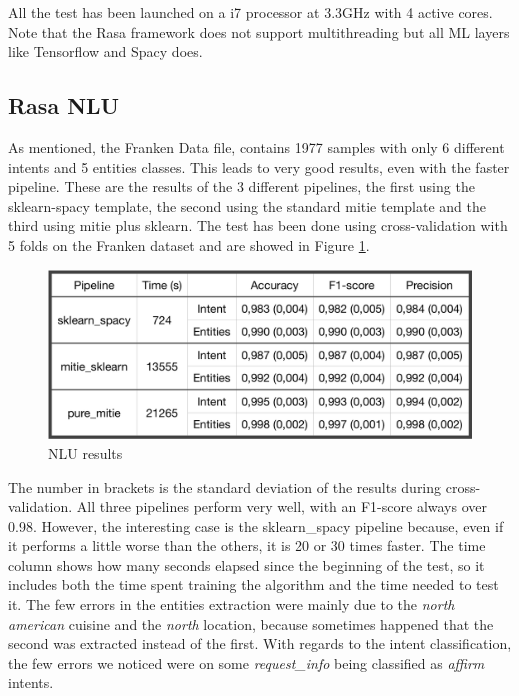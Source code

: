 \documentclass[11pt,a4paper]{article}
\begin{document}
All the test has been launched on a i7 processor at 3.3GHz with 4 active cores. Note that the Rasa framework does not support multithreading but all ML layers like Tensorflow and Spacy does.

\subsection{Rasa NLU}

As mentioned, the Franken Data file, contains 1977 samples with only 6 different intents and 5 entities classes. This leads to very good results, even with the faster pipeline. These are the results of the 3 different pipelines, the first using the sklearn-spacy template, the second using the standard mitie template and the third using mitie plus sklearn. The test has been done using cross-validation with 5 folds on the Franken dataset and are showed in Figure \ref{fig:results1}.

\begin{figure}
  \includegraphics[scale=0.23]{nlu_results}
  \caption{NLU results}
  \label{fig:results1}
\end{figure}

The number in brackets is the standard deviation of the results during cross-validation. All three pipelines perform very well, with an F1-score always over 0.98. However, the interesting case is the sklearn\_spacy pipeline because, even if it performs a little worse than the others, it is 20 or 30 times faster. The time column shows how many seconds elapsed since the beginning of the test, so it includes both the time spent training the algorithm and the time needed to test it. The few errors in the entities extraction were mainly due to the \textit{north american} cuisine and the \textit{north} location, because sometimes happened that the second was extracted instead of the first. With regards to the intent classification, the few errors we noticed were on some \textit{request\_info} being classified as \textit{affirm} intents.  
\end{document}
